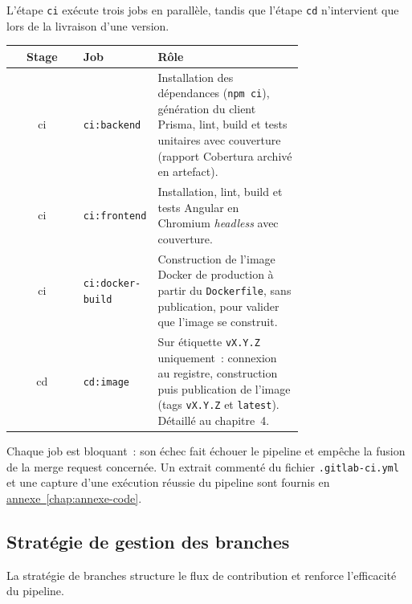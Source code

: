 L'étape \texttt{ci} exécute trois jobs en parallèle, tandis que l'étape \texttt{cd} n'intervient que lors de la livraison d'une version.

\begin{table}[H]
    \centering
    \small
    \begin{tabular}{|c|>{\raggedright\arraybackslash}p{0.22\linewidth}|>{\raggedright\arraybackslash}p{0.50\linewidth}|}
        \hline
        \textbf{Stage} & \textbf{Job} & \textbf{Rôle} \\
        \hline
        ci & \texttt{ci:backend} & Installation des dépendances (\texttt{npm ci}), génération du client Prisma, lint, build et tests unitaires avec couverture (rapport Cobertura archivé en artefact). \\
        \hline
        ci & \texttt{ci:frontend} & Installation, lint, build et tests Angular en Chromium \emph{headless} avec couverture. \\
        \hline
        ci & \texttt{ci:docker-build} & Construction de l'image Docker de production à partir du \texttt{Dockerfile}, sans publication, pour valider que l'image se construit. \\
        \hline
        cd & \texttt{cd:image} & Sur étiquette \texttt{vX.Y.Z} uniquement~: connexion au registre, construction puis publication de l'image (tags \texttt{vX.Y.Z} et \texttt{latest}). Détaillé au chapitre~4. \\
        \hline
    \end{tabular}
\end{table}

Chaque job est bloquant~: son échec fait échouer le pipeline et empêche la fusion de la merge request concernée. Un extrait commenté du fichier \texttt{.gitlab-ci.yml} et une capture d'une exécution réussie du pipeline sont fournis en \hyperref[ann:ci-extract]{annexe~\ref*{chap:annexe-code}}.

\newpage
\subsection{Stratégie de gestion des branches}
La stratégie de branches structure le flux de contribution et renforce l'efficacité du pipeline.

